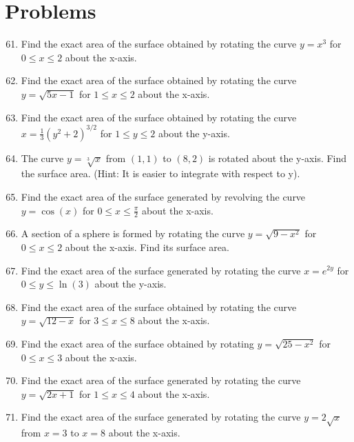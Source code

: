 \documentclass{article}
\begin{document}
\section*{Problems}
\begin{enumerate}
    \setcounter{enumi}{60}
    \item Find the exact area of the surface obtained by rotating the curve $y = x^3$ for $0 \le x \le 2$ about the x-axis.

    \item Find the exact area of the surface obtained by rotating the curve $y = \sqrt{5x-1}$ for $1 \le x \le 2$ about the x-axis.

    \item Find the exact area of the surface obtained by rotating the curve $x = \frac{1}{3}(y^2 + 2)^{3/2}$ for $1 \le y \le 2$ about the y-axis.

    \item The curve $y = \sqrt[3]{x}$ from $(1, 1)$ to $(8, 2)$ is rotated about the y-axis. Find the surface area. (Hint: It is easier to integrate with respect to y).

    \item Find the exact area of the surface generated by revolving the curve $y = \cos(x)$ for $0 \le x \le \frac{\pi}{2}$ about the x-axis.

    \item A section of a sphere is formed by rotating the curve $y = \sqrt{9-x^2}$ for $0 \le x \le 2$ about the x-axis. Find its surface area.

    \item Find the exact area of the surface generated by rotating the curve $x=e^{2y}$ for $0 \le y \le \ln(3)$ about the y-axis.

    \item Find the exact area of the surface obtained by rotating the curve $y = \sqrt{12-x}$ for $3 \le x \le 8$ about the x-axis.

    \item Find the exact area of the surface obtained by rotating $y = \sqrt{25-x^2}$ for $0 \le x \le 3$ about the x-axis.

    \item Find the exact area of the surface generated by rotating the curve $y = \sqrt{2x+1}$ for $1 \le x \le 4$ about the x-axis.

    \item Find the exact area of the surface generated by rotating the curve $y=2\sqrt{x}$ from $x=3$ to $x=8$ about the x-axis.
    

\end{enumerate}
\end{document}
